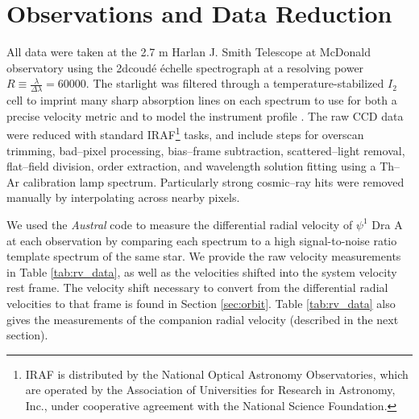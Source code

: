 \documentclass[twocolumn]{emulateapj}
\begin{document}
\section{Observations and Data Reduction}
\label{sec:obs}
All data were taken at the 2.7 m Harlan J. Smith Telescope at McDonald observatory using the 2dcoud\'e \'echelle spectrograph \citep{TS23} at a resolving power $R\equiv \frac{\lambda}{\Delta \lambda} = 60000$. The starlight was filtered through a temperature-stabilized $I_2$ cell to imprint many sharp absorption lines on each spectrum to use for both a precise velocity metric \citep{Butler1996} and to model the instrument profile \citep{Endl2000}. The raw CCD data were reduced with standard IRAF\footnote{IRAF is distributed by the National Optical Astronomy Observatories, which are operated by the Association of Universities for Research in Astronomy, Inc., under cooperative agreement with the National Science Foundation.} tasks, and include steps for overscan trimming, bad--pixel processing, bias--frame subtraction, scattered--light removal, flat--field division, order extraction, and wavelength solution fitting using a Th--Ar calibration lamp spectrum. Particularly strong cosmic--ray hits were removed manually by interpolating across nearby pixels.

We used the \emph{Austral} code \citep{Endl2000} to measure the differential radial velocity of $\psi^1$ Dra A at each observation by comparing each spectrum to a high signal-to-noise ratio template spectrum of the same star. We provide the raw velocity measurements in Table \ref{tab:rv_data}, as well as the velocities shifted into the system velocity rest frame. The velocity shift necessary to convert from the differential radial velocities to that frame is found in Section \ref{sec:orbit}. Table \ref{tab:rv_data} also gives the measurements of the companion radial velocity (described in the next section).
\end{document}
